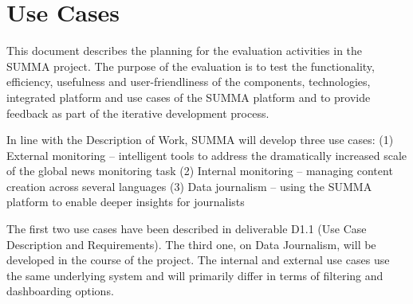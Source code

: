 \section{Use Cases}

This document describes the planning for the evaluation activities in the SUMMA project.
The purpose of the evaluation is to test the functionality, efficiency, usefulness and user-friendliness of the components, technologies, integrated platform and use cases of the SUMMA platform and to provide feedback as part of the iterative development process.

In line with the Description of Work, SUMMA will develop three use cases:
(1)	External monitoring – intelligent tools to address the dramatically increased scale of the global news monitoring task
(2)	Internal monitoring – managing content creation across several languages
(3)	Data journalism – using the SUMMA platform to enable deeper insights for journalists

The first two use cases have been described in deliverable D1.1 (Use Case Description and Requirements). The third one, on Data Journalism, will be developed in the course of the project. The internal and external use cases use the same underlying system and will primarily differ in terms of filtering and dashboarding options. 
